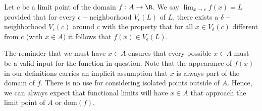\begin{tcolorbox}
\begin{defn}
    Let \( c  \) be a limit point of the domain \( f: A \to \R  \). We say \( \lim_{ x \to c } f(x) = L  \) provided that for every \( \epsilon - \)neighborhood \( V_{\epsilon }(L)  \) of \( L \), there exists a \( \delta- \)neighborhood \( V_{\epsilon }(c) \) around \( c \) with the property that for all \( x \in V_{\delta}(c) \) different from \( c  \) (with \( x \in A  \)) it follows that \( f(x) \in V_{\epsilon }(L) \).
\end{defn}
\end{tcolorbox}

The reminder that we must have \( x \in A   \) ensures that every possible \( x \in A  \) must be a valid input for the function in question. Note that the appearance of \( f(x) \) in our definitions carries an implicit assumption that \( x  \) is always part of the domain of \( f \). There is no use for considering isolated points outside of \( A  \). Hence, we can always expect that functional limits will have \( x \in A  \) that approach the limit point of \( A  \) or \( \text{dom}(f) \).

